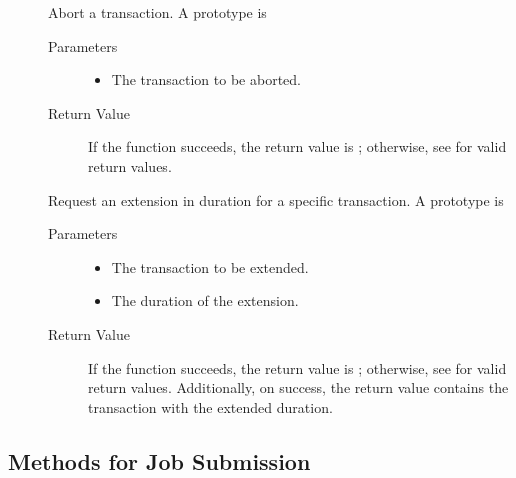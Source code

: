 \begin{description}
\item []
  Abort a transaction.
  A prototype is


  \begin{description}
    \item[ Parameters]
    \begin{itemize}
      \item {} The transaction to be aborted.
    \end{itemize}
    \item[ Return Value]
      If the function succeeds, the return value is ; 
      otherwise, see  for valid return values. 
  \end{description}  
  
\item []
  Request an extension in duration for a specific transaction.
  A prototype is


  \begin{description}
    \item[ Parameters]
    \begin{itemize}
      \item {} The transaction to be extended.
      \item {} The duration of the extension.
    \end{itemize}
    \item[ Return Value]
      If the function succeeds, the return value is ; 
      otherwise, see  for valid return values. Additionally,
      on success, the return value contains the transaction with the extended
      duration.
  \end{description}  
  
\end{description}

\subsection{\label{WebService-Submission} Methods for Job Submission}

